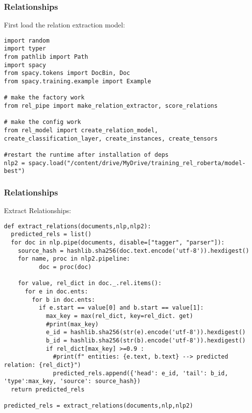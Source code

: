 \begin{frame}[fragile]\frametitle{Relationships}

First load the relation extraction model:

\begin{lstlisting}
import random
import typer
from pathlib import Path
import spacy
from spacy.tokens import DocBin, Doc
from spacy.training.example import Example

# make the factory work
from rel_pipe import make_relation_extractor, score_relations

# make the config work
from rel_model import create_relation_model, create_classification_layer, create_instances, create_tensors

#restart the runtime after installation of deps
nlp2 = spacy.load("/content/drive/MyDrive/training_rel_roberta/model-best")
\end{lstlisting}
	 
\end{frame}


\begin{frame}[fragile]\frametitle{Relationships}

Extract Relationships:

\begin{lstlisting}
def extract_relations(documents,nlp,nlp2):
  predicted_rels = list()
  for doc in nlp.pipe(documents, disable=["tagger", "parser"]):
    source_hash = hashlib.sha256(doc.text.encode('utf-8')).hexdigest()
    for name, proc in nlp2.pipeline:
          doc = proc(doc)

    for value, rel_dict in doc._.rel.items():
      for e in doc.ents:
        for b in doc.ents:
          if e.start == value[0] and b.start == value[1]:
            max_key = max(rel_dict, key=rel_dict. get)
            #print(max_key)
            e_id = hashlib.sha256(str(e).encode('utf-8')).hexdigest()
            b_id = hashlib.sha256(str(b).encode('utf-8')).hexdigest()
            if rel_dict[max_key] >=0.9 :
              #print(f" entities: {e.text, b.text} --> predicted relation: {rel_dict}")
              predicted_rels.append({'head': e_id, 'tail': b_id, 'type':max_key, 'source': source_hash})
  return predicted_rels

predicted_rels = extract_relations(documents,nlp,nlp2)
\end{lstlisting}
	 
\end{frame}


